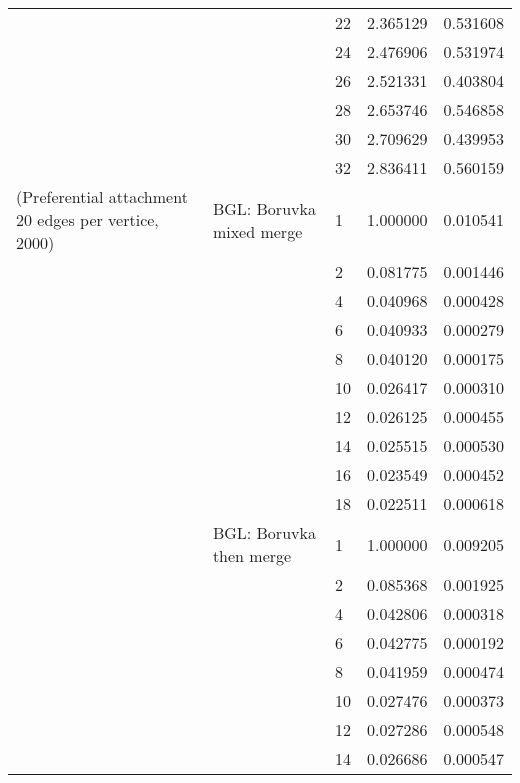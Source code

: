 \begin{tabular}{lllrr}
                      &            & 22 &  2.365129 &  0.531608 \\
                      &            & 24 &  2.476906 &  0.531974 \\
                      &            & 26 &  2.521331 &  0.403804 \\
                      &            & 28 &  2.653746 &  0.546858 \\
                      &            & 30 &  2.709629 &  0.439953 \\
                      &            & 32 &  2.836411 &  0.560159 \\
(Preferential attachment 20 edges per vertice, 2000) & BGL: Boruvka mixed merge & 1  &  1.000000 &  0.010541 \\
                      &            & 2  &  0.081775 &  0.001446 \\
                      &            & 4  &  0.040968 &  0.000428 \\
                      &            & 6  &  0.040933 &  0.000279 \\
                      &            & 8  &  0.040120 &  0.000175 \\
                      &            & 10 &  0.026417 &  0.000310 \\
                      &            & 12 &  0.026125 &  0.000455 \\
                      &            & 14 &  0.025515 &  0.000530 \\
                      &            & 16 &  0.023549 &  0.000452 \\
                      &            & 18 &  0.022511 &  0.000618 \\
                      & BGL: Boruvka then merge & 1  &  1.000000 &  0.009205 \\
                      &            & 2  &  0.085368 &  0.001925 \\
                      &            & 4  &  0.042806 &  0.000318 \\
                      &            & 6  &  0.042775 &  0.000192 \\
                      &            & 8  &  0.041959 &  0.000474 \\
                      &            & 10 &  0.027476 &  0.000373 \\
                      &            & 12 &  0.027286 &  0.000548 \\
                      &            & 14 &  0.026686 &  0.000547 \\

\end{tabular}
